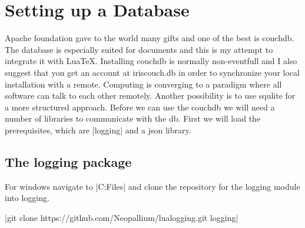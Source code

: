 \section{Setting up a Database}

Apache foundation gave to the world many gifts and one of the best is couchdb. The database is especially suited for documents and this is my attempt to integrate it with LuaTeX. Installing couchdb is normally non-eventfull and I also suggest that you get an account at iriscouch.db in order to synchronize your local installation with a remote. Computing is converging to a paradigm where all software can talk to each other remotely. Another possibility is to use squlite for a more structured approach. Before we can use the couchdb we will need  a number of libraries to communicate with the db. First we will load the prerequisites, which are |logging| and a json library. 

\subsection{The logging package}

For windows navigate to |C:\Program Files\scripts| and clone the repository for the logging module into logging. 

|git clone https://github.com/Neopallium/lualogging.git  logging|


